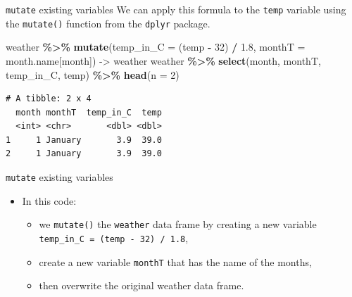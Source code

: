 \documentclass[
  ignorenonframetext,
]{beamer}
\newenvironment{Shaded}{\begin{snugshade}}{\end{snugshade}}
\newcommand{\AttributeTok}[1]{\textcolor[rgb]{0.13,0.29,0.53}{#1}}
\newcommand{\DecValTok}[1]{\textcolor[rgb]{0.00,0.00,0.81}{#1}}
\newcommand{\FloatTok}[1]{\textcolor[rgb]{0.00,0.00,0.81}{#1}}
\newcommand{\FunctionTok}[1]{\textcolor[rgb]{0.13,0.29,0.53}{\textbf{#1}}}
\newcommand{\NormalTok}[1]{#1}
\newcommand{\OtherTok}[1]{\textcolor[rgb]{0.56,0.35,0.01}{#1}}
\newcommand{\SpecialCharTok}[1]{\textcolor[rgb]{0.81,0.36,0.00}{\textbf{#1}}}
\providecommand{\tightlist}{%
  \setlength{\itemsep}{0pt}\setlength{\parskip}{0pt}}
\begin{document}
\begin{frame}[fragile]{\texttt{mutate} existing variables}
\protect\hypertarget{mutate-existing-variables-1}{}
We can apply this formula to the \texttt{temp} variable using the
\texttt{mutate()} function from the \texttt{dplyr} package.

\normalsize

\begin{Shaded}
\begin{Highlighting}[]
\NormalTok{weather }\SpecialCharTok{\%\textgreater{}\%} 
  \FunctionTok{mutate}\NormalTok{(}\AttributeTok{temp\_in\_C =}\NormalTok{ (temp }\SpecialCharTok{{-}} \DecValTok{32}\NormalTok{) }\SpecialCharTok{/} \FloatTok{1.8}\NormalTok{,}
         \AttributeTok{monthT =}\NormalTok{ month.name[month]) }\OtherTok{{-}\textgreater{}}\NormalTok{ weather}
\NormalTok{weather }\SpecialCharTok{\%\textgreater{}\%} \FunctionTok{select}\NormalTok{(month, monthT, temp\_in\_C, temp) }\SpecialCharTok{\%\textgreater{}\%} 
  \FunctionTok{head}\NormalTok{(}\AttributeTok{n =} \DecValTok{2}\NormalTok{)}
\end{Highlighting}
\end{Shaded}

\begin{verbatim}
# A tibble: 2 x 4
  month monthT  temp_in_C  temp
  <int> <chr>       <dbl> <dbl>
1     1 January       3.9  39.0
2     1 January       3.9  39.0
\end{verbatim}

\normalsize
\end{frame}

\begin{frame}[fragile]{\texttt{mutate} existing variables}
\protect\hypertarget{mutate-existing-variables-2}{}
\begin{itemize}
\item
  In this code:

  \begin{itemize}
  \tightlist
  \item
    we \texttt{mutate()} the \texttt{weather} data frame by creating a
    new variable \texttt{temp\_in\_C\ =\ (temp\ -\ 32)\ /\ 1.8},
  \item
    create a new variable \texttt{monthT} that has the name of the
    months,
  \item
    then overwrite the original weather data frame.
  \end{itemize}
\end{itemize}
\end{frame}
\end{document}
